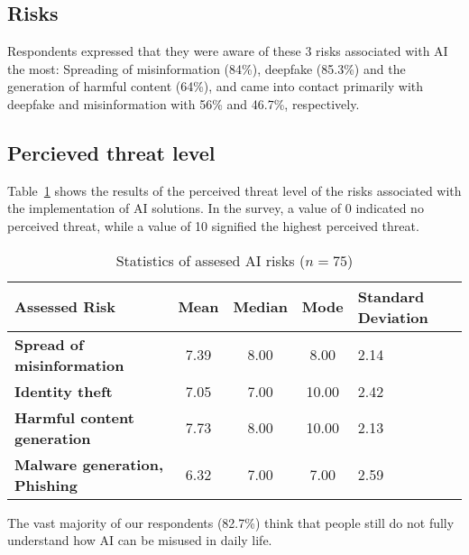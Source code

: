 \subsection*{Risks}

Respondents expressed that they were aware of these 3 risks associated with AI the most: Spreading of misinformation (84\%), deepfake (85.3\%) and the generation of harmful content (64\%), and came into contact primarily with deepfake and misinformation with 56\% and 46.7\%, respectively.

\subsection*{Percieved threat level}

Table~\ref{tab:survey_ai_risk_statistics} shows the results of the perceived threat level of the risks associated with the implementation of AI solutions. In the survey, a value of 0 indicated no perceived threat, while a value of 10 signified the highest perceived threat.

{
    \renewcommand{\arraystretch}{1.2}
    \begin{table}[htpb]
        \centering
        \caption{Statistics of assesed AI risks ($n=75$)}
        \begin{tabular}{|l|c|c|c|p{2.1cm}|}
            \hline
            \cellcolor[gray]{0.8}\textbf{Assessed Risk} & \cellcolor[gray]{0.8}\textbf{Mean} & \cellcolor[gray]{0.8}\textbf{Median} & \cellcolor[gray]{0.8}\textbf{Mode} & \cellcolor[gray]{0.8}\textbf{Standard Deviation} \\ \hline
            \textbf{Spread of misinformation} & 7.39 & 8.00 & 8.00 & 2.14 \\ \hline
            \textbf{Identity theft} & 7.05 & 7.00 & 10.00 & 2.42 \\ \hline
            \textbf{Harmful content generation} & 7.73 & 8.00 & 10.00 & 2.13 \\ \hline
            \textbf{Malware generation, Phishing} & 6.32 & 7.00 & 7.00 & 2.59 \\ \hline
        \end{tabular}
        \label{tab:survey_ai_risk_statistics}
    \end{table}
}

The vast majority of our respondents (82.7\%) think that people still do not fully understand how AI can be misused in daily life. 

